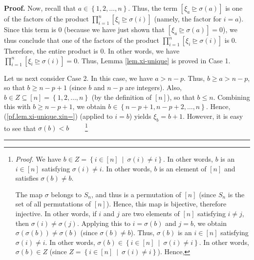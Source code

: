 \documentclass[numbers=enddot,12pt,final,onecolumn,notitlepage,english]{scrartcl}%
\theoremstyle{definition}
\newenvironment{proof}[1][Proof]{\noindent\textbf{#1.} }{\ \rule{0.5em}{0.5em}}
\let\prodnonlimits\prod
\renewcommand{\prod}{\prodnonlimits\limits}
\newenvironment{verlong}{}{}
\begin{document}
\begin{verlong}
\begin{proof}
Now, recall that $a\in\left\{  1,2,\ldots,n\right\}  $. Thus, the term
$\left[  \xi_{a}\trianglerighteq\sigma\left(  a\right)  \right]  $ is one of
the factors of the product $\prod_{i=1}^{n}\left[  \xi_{i}\trianglerighteq
\sigma\left(  i\right)  \right]  $ (namely, the factor for $i=a$). Since this
term is $0$ (because we have just shown that $\left[  \xi_{a}\trianglerighteq
\sigma\left(  a\right)  \right]  =0$), we thus conclude that one of the
factors of the product $\prod_{i=1}^{n}\left[  \xi_{i}\trianglerighteq
\sigma\left(  i\right)  \right]  $ is $0$. Therefore, the entire product is
$0$. In other words, we have $\prod_{i=1}^{n}\left[  \xi_{i}\trianglerighteq
\sigma\left(  i\right)  \right]  =0$. Thus, Lemma \ref{lem.xi-unique} is
proved in Case 1.

Let us next consider Case 2. In this case, we have $a>n-p$. Thus, $b\geq
a>n-p$, so that $b\geq n-p+1$ (since $b$ and $n-p$ are integers). Also, $b\in
Z\subseteq\left[  n\right]  =\left\{  1,2,\ldots,n\right\}  $ (by the
definition of $\left[  n\right]  $), so that $b\leq n$. Combining this with
$b\geq n-p+1$, we obtain $b\in\left\{  n-p+1,n-p+2,\ldots,n\right\}  $. Hence,
(\ref{pf.lem.xi-unique.xin=}) (applied to $i=b$) yields $\xi_{b}=b+1$.
However, it is easy to see that $\sigma\left(  b\right)  <b$%
\ \ \ \ \footnote{\textit{Proof.} We have $b\in Z=\left\{  i\in\left[
n\right]  \ \mid\ \sigma\left(  i\right)  \neq i\right\}  $. In other words,
$b$ is an $i\in\left[  n\right]  $ satisfying $\sigma\left(  i\right)  \neq
i$. In other words, $b$ is an element of $\left[  n\right]  $ and satisfies
$\sigma\left(  b\right)  \neq b$.
\par
The map $\sigma$ belongs to $S_{n}$, and thus is a permutation of $\left[
n\right]  $ (since $S_{n}$ is the set of all permutations of $\left[
n\right]  $). Hence, this map is bijective, therefore injective. In other
words, if $i$ and $j$ are two elements of $\left[  n\right]  $ satisfying
$i\neq j$, then $\sigma\left(  i\right)  \neq\sigma\left(  j\right)  $.
Applying this to $i=\sigma\left(  b\right)  $ and $j=b$, we obtain
$\sigma\left(  \sigma\left(  b\right)  \right)  \neq\sigma\left(  b\right)  $
(since $\sigma\left(  b\right)  \neq b$). Thus, $\sigma\left(  b\right)  $ is
an $i\in\left[  n\right]  $ satisfying $\sigma\left(  i\right)  \neq i$. In
other words, $\sigma\left(  b\right)  \in\left\{  i\in\left[  n\right]
\ \mid\ \sigma\left(  i\right)  \neq i\right\}  $. In other words,
$\sigma\left(  b\right)  \in Z$ (since $Z=\left\{  i\in\left[  n\right]
\ \mid\ \sigma\left(  i\right)  \neq i\right\}  $). Hence,
}
\end{proof}
\end{verlong}
\end{document}
